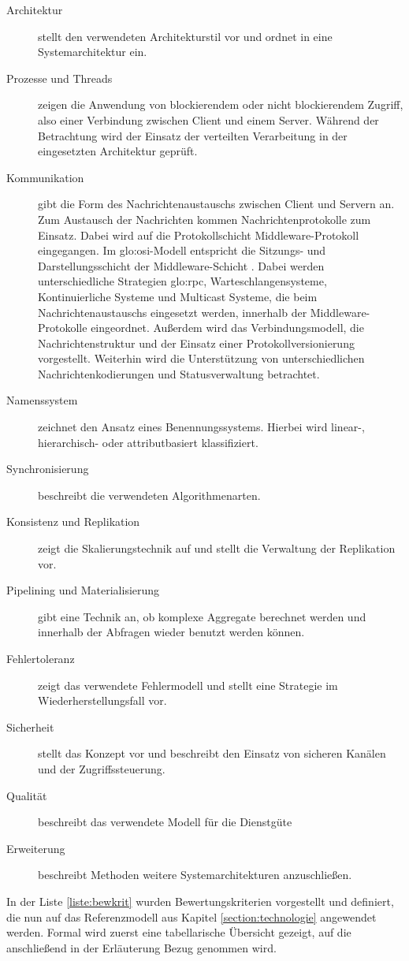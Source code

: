 \begin{description}
	\item[Architektur] stellt den verwendeten Architekturstil vor und ordnet in eine Systemarchitektur ein.
	\item[Prozesse und Threads] zeigen die Anwendung von blockierendem oder nicht blockierendem Zugriff, also einer Verbindung zwischen Client und einem Server. Während der Betrachtung wird der Einsatz der verteilten Verarbeitung in der eingesetzten Architektur geprüft.
	\item[Kommunikation] gibt die Form des Nachrichtenaustauschs zwischen Client und Servern an. Zum Austausch der Nachrichten kommen Nachrichtenprotokolle zum Einsatz. Dabei wird auf die Protokollschicht Middleware-Protokoll eingegangen. Im \acrshort{glo:osi}-Modell entspricht die Sitzungs- und Darstellungsschicht der Middleware-Schicht . Dabei werden unterschiedliche Strategien \gls{glo:rpc}, Warteschlangensysteme, Kontinuierliche Systeme und Multicast Systeme, die beim Nachrichtenaustauschs eingesetzt werden, innerhalb der Middleware-Protokolle eingeordnet. Außerdem wird das Verbindungsmodell, die Nachrichtenstruktur und der Einsatz einer Protokollversionierung vorgestellt. Weiterhin wird die Unterstützung von unterschiedlichen Nachrichtenkodierungen und Statusverwaltung betrachtet.
	\item[Namenssystem] zeichnet den Ansatz eines Benennungssystems. Hierbei wird linear-, hierarchisch- oder attributbasiert klassifiziert.
	\item[Synchronisierung] beschreibt die verwendeten Algorithmenarten. 
	\item[Konsistenz und Replikation] zeigt die Skalierungstechnik auf und stellt die Verwaltung der Replikation vor. 
	\item[Pipelining und Materialisierung] gibt eine Technik an, ob komplexe Aggregate berechnet werden und innerhalb der Abfragen wieder benutzt werden können.
	\item[Fehlertoleranz] zeigt das verwendete Fehlermodell und stellt eine Strategie im Wiederherstellungsfall vor.
	\item[Sicherheit] stellt das Konzept vor und beschreibt den Einsatz von sicheren Kanälen und der Zugriffssteuerung.
	\item[Qualität] beschreibt das verwendete Modell für die Dienstgüte
	\item[Erweiterung] beschreibt Methoden weitere Systemarchitekturen anzuschließen.
\end{description}

In der Liste \ref{liste:bewkrit} wurden Bewertungskriterien vorgestellt und definiert, die nun auf das Referenzmodell aus Kapitel \ref{section:technologie} angewendet werden. Formal wird zuerst eine tabellarische Übersicht gezeigt, auf die anschließend in der Erläuterung Bezug genommen wird.

